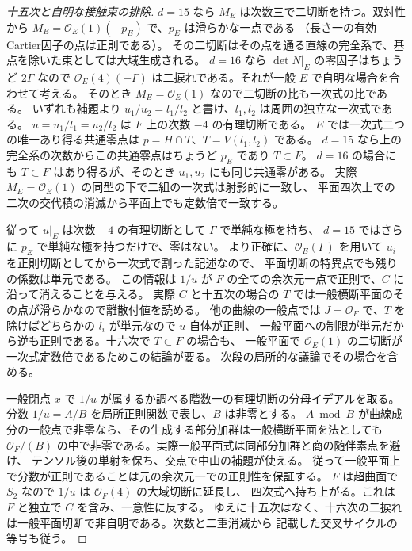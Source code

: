 \begin{proof}[十五次と自明な接触束の排除]
$d=15$ なら $M_E$ は次数三で二切断を持つ。双対性から
$M_E=\mathcal O_E(1)(-p_E)$ で、$p_E$ は滑らかな一点である
（長さ一の有効Cartier因子の点は正則である）。
その二切断はその点を通る直線の完全系で、基点を除いた束としては大域生成される。
$d=16$ なら $\det N|_E$ の零因子はちょうど $2\Gamma$ なので
$\mathcal O_E(4)(-\Gamma)$ は二捩れである。それが一般 $E$ で自明な場合を合わせて考える。
そのとき $M_E=\mathcal O_E(1)$ なので二切断の比も一次式の比である。
いずれも補題より $u_1/u_2=l_1/l_2$ と書け、$l_1,l_2$ は周囲の独立な一次式である。
$u=u_1/l_1=u_2/l_2$ は $F$ 上の次数 $-4$ の有理切断である。
$E$ では一次式二つの唯一あり得る共通零点は $p=H\cap T$、$T=V(l_1,l_2)$ である。
$d=15$ なら上の完全系の次数からこの共通零点はちょうど $p_E$ であり $T\subset F$。
$d=16$ の場合にも $T\subset F$ はあり得るが、そのとき $u_1,u_2$ にも同じ共通零がある。
実際 $M_E=\mathcal O_E(1)$ の同型の下で二組の一次式は射影的に一致し、
平面四次上での二次の交代積の消滅から平面上でも定数倍で一致する。

従って $u|_E$ は次数 $-4$ の有理切断として $\Gamma$ で単純な極を持ち、
$d=15$ ではさらに $p_E$ で単純な極を持つだけで、零はない。
より正確に、$\mathcal O_E(\Gamma)$ を用いて $u_i$ を正則切断としてから一次式で割った記述なので、
平面切断の特異点でも残りの係数は単元である。
この情報は $1/u$ が $F$ の全ての余次元一点で正則で、$C$ に沿って消えることを与える。
実際 $C$ と十五次の場合の $T$ では一般横断平面のその点が滑らかなので離散付値を読める。
他の曲線の一般点では $J=\mathcal O_F$ で、$T$ を除けばどちらかの $l_i$ が単元なので $u$ 自体が正則、
一般平面への制限が単元だから逆も正則である。十六次で $T\subset F$ の場合も、
一般平面で $\mathcal O_E(1)$ の二切断が一次式定数倍であるためこの結論が要る。
次段の局所的な議論でその場合を含める。

一般閉点 $x$ で $1/u$ が属するか調べる階数一の有理切断の分母イデアルを取る。
分数 $1/u=A/B$ を局所正則関数で表し、$B$ は非零とする。
$A\bmod B$ が曲線成分の一般点で非零なら、その生成する部分加群は一般横断平面を法としても
$\mathcal O_F/(B)$ の中で非零である。実際一般平面式は同部分加群と商の随伴素点を避け、
テンソル後の単射を保ち、交点で中山の補題が使える。
従って一般平面上で分数が正則であることは元の余次元一での正則性を保証する。
$F$ は超曲面で $S_2$ なので $1/u$ は $\mathcal O_F(4)$ の大域切断に延長し、
四次式へ持ち上がる。これは $F$ と独立で $C$ を含み、一意性に反する。
ゆえに十五次はなく、十六次の二捩れは一般平面切断で非自明である。次数と二重消滅から
記載した交叉サイクルの等号も従う。
\end{proof}
